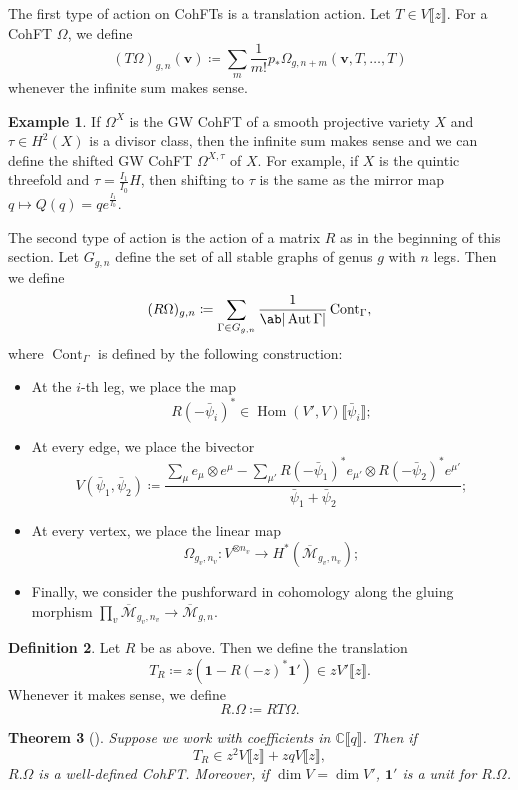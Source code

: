 \documentclass[10pt]{amsart}
\newtheorem{thm}{Theorem}[section]
\theoremstyle{definition}
\newtheorem{defn}[thm]{Definition}
\newtheorem{exm}[thm]{Example}
\theoremstyle{remark}
\theoremstyle{plain}
\theoremstyle{definition}
\theoremstyle{remark}
\newcommand{\C}{\mathbb{C}}
\newcommand{\Mbar}{\overline{\mathcal{M}}}
\newcommand{\mbf}[1]{\mathbf{#1}}
\newcommand{\bv}{\mbf{v}}
\newcommand{\on}[1]{\operatorname{#1}}
\newcommand{\1}{\mathbf{1}}
\newcommand{\2}{\mathbf{2}}
\newcommand{\3}{\mathbf{3}}
\newcommand{\ps}[1]{\llbracket #1 \rrbracket}
\DeclareMathOperator{\Hom}{Hom}
\DeclareMathOperator{\Aut}{Aut}
\begin{document}
The first type of action on CohFTs is a translation action. Let $T \in V\ps{z}$. For a CohFT $\Omega$, we define
\[ (T\Omega)_{g,n}(\bv) \coloneqq \sum_m \frac{1}{m!} p_* \Omega_{g,n+m}(\bv, T,\ldots,T) \]
whenever the infinite sum makes sense.

\begin{exm}
    If $\Omega^X$ is the GW CohFT of a smooth projective variety $X$ and $\tau \in H^2(X)$ is a divisor class, then the infinite sum makes sense and we can define the shifted GW CohFT $\Omega^{X,\tau}$ of $X$. For example, if $X$ is the quintic threefold and $\tau = \frac{I_1}{I_0} H$, then shifting to $\tau$ is the same as the mirror map $q \mapsto Q(q) = q e^{\frac{I_1}{I_0}}$.
\end{exm}

The second type of action is the action of a matrix $R$ as in the beginning of this section. Let $G_{g,n}$ define the set of all stable graphs of genus $g$ with $n$ legs. Then we define
\[ (R\Omega)_{g,n} \coloneqq \sum_{\Gamma \in G_{g,n}} \frac{1}{\ab|\Aut \Gamma|} \on{Cont}_{\Gamma}, \]
where $\on{Cont}_{\Gamma}$ is defined by the following construction:
\begin{itemize}
    \item At the $i$-th leg, we place the map 
        \[ R(-\bar{\psi}_i)^* \in \Hom(V',V) \ps{\bar{\psi}_i}; \]
    \item At every edge, we place the bivector
        \[ V(\bar{\psi}_1, \bar{\psi}_2) \coloneqq  \frac{\sum_{\mu}e_{\mu} \otimes e^{\mu} - \sum_{\mu'} R(-\bar{\psi}_1)^* e_{\mu'} \otimes R(-\bar{\psi}_2)^* e^{\mu'}}{\bar{\psi}_1 + \bar{\psi}_2}; \]
    \item At every vertex, we place the linear map
        \[ \Omega_{g_v, n_v} \colon V^{\otimes n_v} \to H^*(\Mbar_{g_v, n_v}); \]
    \item Finally, we consider the pushforward in cohomology along the gluing morphism $\prod_v \Mbar_{g_v, n_v} \to \Mbar_{g,n}$.
\end{itemize}

\begin{defn}
    Let $R$ be as above. Then we define the translation
    \[ T_R \coloneqq z (\1 - R(-z)^* \1') \in z V'\ps{z}. \]
    Whenever it makes sense, we define
    \[ R.\Omega \coloneqq RT\Omega. \]
\end{defn}

\begin{thm}[{\cite{nmsp3}}]
    Suppose we work with coefficients in $\C\ps{q}$. Then if
    \[ T_R \in z^2 V \ps{z} + zq V \ps{z}, \]
    $R.\Omega$ is a well-defined CohFT. Moreover, if $\dim V = \dim V'$, $\1'$ is a unit for $R.\Omega$.
\end{thm}
\end{document}
